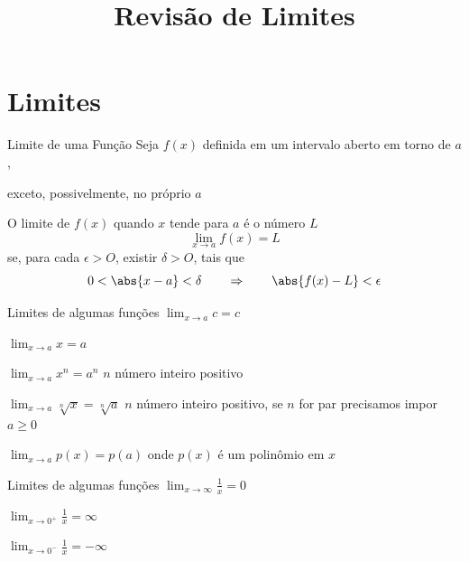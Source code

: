 \documentclass[fleqn,utf8,aspectratio=169,12pt]{beamer}
\title{Revisão de Limites}
\begin{document}
\addtitle

\section{Limites}

\begin{frame}{Limite de uma Função}
  Seja $f(x)$ definida em um intervalo aberto em torno de $a$,

  \pause
  exceto, possivelmente, no próprio $a$

  \pause
  O limite de $f(x)$ quando $x$ tende para $a$ é o número $L$
  \[
    \lim_{x\to a} f(x) = L
  \]
  \pause
  se, para cada \(\epsilon > O\), existir \(\delta > O\), tais que
  \pause
  \[
    0 < \abs{x-a} < \delta \qquad\Rightarrow\qquad \abs{f(x)-L} < \epsilon
  \]
\end{frame}

\begin{frame}{Limites de algumas funções}
  \( \lim_{x\to a} c = c \)

  \pause
  \medskip
  \( \lim_{x\to a} x = a \)

  \pause
  \medskip
  \( \lim_{x\to a} x^n = a^n \)
  \tabto{35mm}
  $n$ número inteiro positivo

  \pause
  \medskip
  \( \lim_{x\to a} \sqrt[n]{x} = \sqrt[n]{a} \)
  \tabto{35mm}
  $n$ número inteiro positivo, se $n$ for par precisamos impor $a\geq 0$

  \pause
  \medskip
  \( \lim_{x\to a} p(x) = p(a) \)
  \tabto{35mm}
  onde $p(x)$ é um polinômio em $x$
\end{frame}

\begin{frame}{Limites de algumas funções}
  \( \lim_{x\to \infty} \frac{1}{x} = 0 \)

  \pause
  \medskip
  \( \lim_{x\to 0^+} \frac{1}{x} = \infty \)

  \pause
  \medskip
  \( \lim_{x\to 0^-} \frac{1}{x} = -\infty \)

\end{frame}
\end{document}
